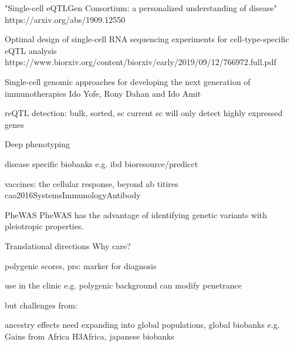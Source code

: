 \begin{outline}
        "Single-cell eQTLGen Consortium: a personalized understanding of disease"
        https://arxiv.org/abs/1909.12550

        Optimal design of single-cell RNA sequencing experiments for cell-type-specific eQTL analysis
        https://www.biorxiv.org/content/biorxiv/early/2019/09/12/766972.full.pdf

        Single-cell genomic approaches for developing the next generation of immunotherapies Ido Yofe, Rony Dahan and Ido Amit


        reQTL detection: bulk, sorted, sc
        current sc will only detect highly expressed genes


Deep phenotyping
        
        disease specific biobanks e.g. ibd bioresource/predicct

    vaccines:
        the cellular response, beyond ab titires cao2016SystemsImmunologyAntibody


    PheWAS\autocite{verma2017CurrentScopeChallenges}
    PheWAS has the advantage of identifying genetic variants with pleiotropic properties.

Translational directions
\1 Why care?

    \2 polygenic scores, prs: marker for diagnosis


        \3 use in the clinic
            \4 e.g. polygenic background can modify penetrance 

        \3 but challenges from:

            \4 ancestry effects
            \4 need expanding into global populations, global biobanks e.g. Gains from Africa H3Africa, japanese biobanks


\end{outline}
